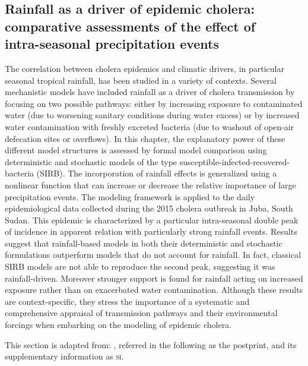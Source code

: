 \begin{fullwidth}
\chapter[Rainfall as a driver of epidemic cholera: comparative assessments of the effect of intra-seasonal precipitation events]{Rainfall as a driver of epidemic cholera:\\comparative assessments of the effect of\\intra-seasonal precipitation events}
\label{ch:cholera-rainfall}

The correlation between cholera epidemics and climatic drivers, in particular seasonal tropical rainfall, has been studied in a variety of contexts. Several mechanistic models have included rainfall as a driver of cholera transmission by focusing on two possible pathways: either by increasing exposure to contaminated water (\eg due to worsening sanitary conditions during water excess) or by increased water contamination with freshly excreted bacteria (\eg due to washout of open-air defecation sites or overflows). In this chapter, the explanatory power of these different model structures is assessed by formal model comparison using deterministic and stochastic models of the type susceptible-infected-recovered-bacteria (SIRB). The incorporation of rainfall effects is generalized using a nonlinear function that can increase or decrease the relative importance of large precipitation events. The modeling framework is applied to the daily epidemiological data collected during the 2015 cholera outbreak in Juba, South Sudan. This epidemic is characterized by a particular intra-seasonal double peak of incidence in apparent relation with particularly strong rainfall events. Results suggest that rainfall-based models in both their deterministic and stochastic formulations outperform models that do not account for rainfall. In fact, classical SIRB models are not able to reproduce the second peak, suggesting it was rainfall-driven. Moreover stronger support is found for rainfall acting on increased exposure rather than on exacerbated water contamination. Although these results are context-specific, they stress the importance of a systematic and comprehensive appraisal of transmission pathways and their environmental forcings when embarking on the modeling of epidemic cholera.

This section is adapted from:
, referred in the following as the postprint, and its supplementary information as \textsc{si}.%
\end{fullwidth}


